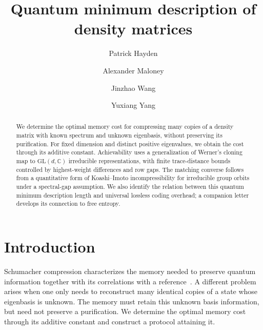 \documentclass[a4paper,onecolumn,11pt]{quantumarticle}
\begin{document}
\title{Quantum minimum description of density matrices}

\author{Patrick Hayden}

\author{Alexander Maloney}

\author{Jinzhao Wang}

\author{Yuxiang Yang}
 
\date{}
\maketitle

\begin{abstract}
We determine the optimal memory cost for compressing many copies of a density matrix with known spectrum and unknown eigenbasis, without preserving its purification. For fixed dimension and distinct positive eigenvalues, we obtain the cost through its additive constant. Achievability uses a generalization of Werner's cloning map to $\mathrm{GL}(d,\mathbb C)$ irreducible representations, with finite trace-distance bounds controlled by highest-weight differences and row gaps. The matching converse follows from a quantitative form of Koashi--Imoto incompressibility for irreducible group orbits under a spectral-gap assumption. We also identify the relation between this quantum minimum description length and universal lossless coding overhead; a companion letter develops its connection to free entropy.
\end{abstract}


\section{Introduction}\label{sec:intro}

Schumacher compression characterizes the memory needed to preserve quantum information together with its correlations with a reference~\cite{schumacher1995quantum}. A different problem arises when one only needs to reconstruct many identical copies of a state whose eigenbasis is unknown. The memory must retain this unknown basis information, but need not preserve a purification. We determine the optimal memory cost through its additive constant and construct a protocol attaining it.
\end{document}
